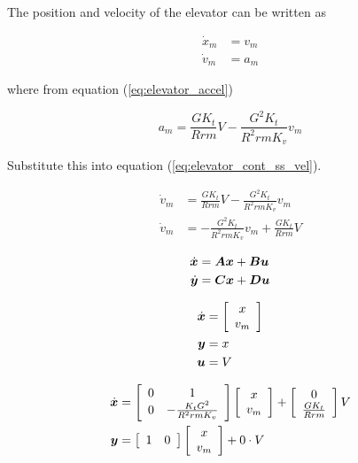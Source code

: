 The position and velocity of the elevator can be written as

\begin{align}
  \dot{x}_m &= v_m \label{eq:elevator_cont_ss_pos} \\
  \dot{v}_m &= a_m \label{eq:elevator_cont_ss_vel}
\end{align}

where from equation (\ref{eq:elevator_accel})

\begin{equation*}
  a_m = \frac{GK_t}{Rrm} V - \frac{G^2 K_t}{R^2 rm K_v} v_m
\end{equation*}

Substitute this into equation (\ref{eq:elevator_cont_ss_vel}).

\begin{align}
  \dot{v}_m &= \frac{GK_t}{Rrm} V - \frac{G^2 K_t}{R^2 rm K_v} v_m \nonumber \\
  \dot{v}_m &= -\frac{G^2 K_t}{R^2 rm K_v} v_m + \frac{GK_t}{Rrm} V
\end{align}

\begin{align*}
  \dot{\bm x} &= \bm A \bm x + \bm B \bm u \\
  \dot{\bm y} &= \bm C \bm x + \bm D \bm u
\end{align*}

\begin{align*}
  \dot{\bm x} &= \left[
  \begin{array}{c}
    x \\
    v_m
  \end{array}
  \right] \\
  \bm y &= x \\
  \bm u &= V
\end{align*}

\begin{align}
  \dot{\bm x} &= \left[
  \begin{array}{cc}
    0 & 1 \\
    0 & -\frac{K_t G^2}{R^2rmK_v}
  \end{array}
  \right] \left[
  \begin{array}{c}
    x \\
    v_m \\
  \end{array}
  \right] + \left[
  \begin{array}{c}
    0 \\
    \frac{GK_t}{Rrm}
  \end{array}
  \right] V \\
  \bm y &= \left[
  \begin{array}{cc}
    1 & 0
  \end{array}
  \right] \left[
  \begin{array}{c}
    x \\
    v_m \\
  \end{array}
  \right] + 0 \cdot V
\end{align}


